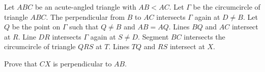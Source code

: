Let $ABC$ be an acute-angled triangle with $AB<AC$. Let $\Gamma$ be the circumcircle of triangle $ABC$. The perpendicular from $B$ to $AC$ intersects $\Gamma$ again at $D\neq B$. Let $Q$ be the point on $\Gamma$ such that $Q\neq B$ and $AB=AQ$. Lines $BQ$ and $AC$ intersect at $R$. Line $DR$ intersects $\Gamma$ again at $S\neq D$. Segment $BC$ intersects the circumcircle of triangle $QRS$ at $T$. Lines $TQ$ and $RS$ intersect at $X$.

Prove that $CX$ is perpendicular to $AB$.
